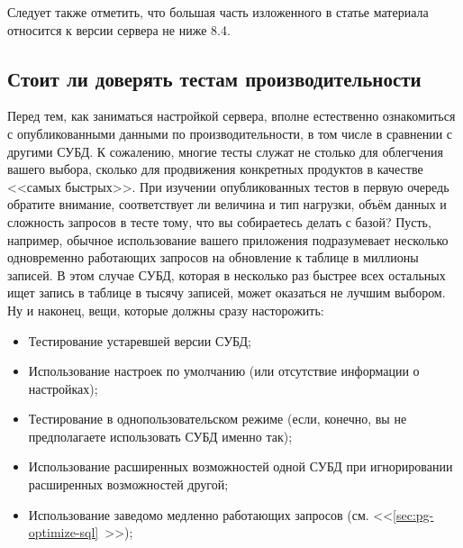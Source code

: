 Следует также отметить, что большая часть изложенного в статье материала относится к версии сервера не ниже 8.4.


\subsection{Стоит ли доверять тестам производительности}

Перед тем, как заниматься настройкой сервера, вполне естественно ознакомиться с опубликованными данными по производительности, в том числе в сравнении с другими СУБД. К сожалению, многие тесты служат не столько для облегчения вашего выбора, сколько для продвижения конкретных продуктов в качестве <<самых быстрых>>. При изучении опубликованных тестов в первую очередь обратите внимание, соответствует ли величина и тип нагрузки, объём данных и сложность запросов в тесте тому, что вы собираетесь делать с базой? Пусть, например, обычное использование вашего приложения подразумевает несколько одновременно работающих запросов на обновление к таблице в миллионы записей. В этом случае СУБД, которая в несколько раз
быстрее всех остальных ищет запись в таблице в тысячу записей, может оказаться не лучшим выбором. Ну и наконец, вещи, которые должны сразу насторожить:

\begin{itemize}
  \item Тестирование устаревшей версии СУБД;
  \item Использование настроек по умолчанию (или отсутствие информации о настройках);
  \item Тестирование в однопользовательском режиме (если, конечно, вы не предполагаете использовать СУБД именно так);
  \item Использование расширенных возможностей одной СУБД при игнорировании расширенных возможностей другой;
  \item Использование заведомо медленно работающих запросов (см. <<\ref{sec:pg-optimize-sql}~>>);
\end{itemize}

